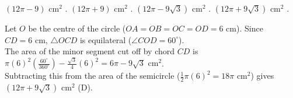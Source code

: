 \begin{minipage}{0.45\textwidth}
\begin{choices}
    \choice $(12\pi - 9)\text{ cm}^2$ .
    \choice $(12\pi + 9)\text{ cm}^2$ .
    \choice $(12\pi - 9\sqrt{3})\text{ cm}^2$ .
    \correctchoice $(12\pi + 9\sqrt{3})\text{ cm}^2$ .
\end{choices}
\end{minipage}
\begin{minipage}{0.52\textwidth}
\centering
{}
\end{minipage}
\begin{solution}
Let $O$ be the centre of the circle ($OA = OB = OC = OD = 6\text{ cm}$). Since $CD = 6\text{ cm}$, $\triangle OCD$ is equilateral ($\angle COD = 60^\circ$). \\
The area of the minor segment cut off by chord $CD$ is $\pi(6)^2\left(\frac{60^\circ}{360^\circ}\right) - \frac{\sqrt{3}}{4}(6)^2 = 6\pi - 9\sqrt{3}\text{ cm}^2$. \\
Subtracting this from the area of the semicircle ($\frac{1}{2}\pi(6)^2 = 18\pi\text{ cm}^2$) gives $(12\pi + 9\sqrt{3})\text{ cm}^2$ (D).
\end{solution}